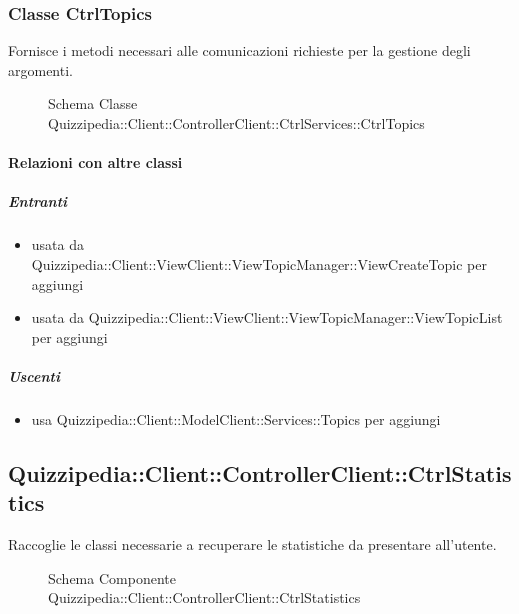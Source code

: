 \subsubsection{Classe CtrlTopics}
Fornisce i metodi necessari alle comunicazioni richieste per la gestione degli argomenti.
\begin{figure}[H]
\centering
\noindent{}
\caption[Schema Classe CtrlTopics]{Schema Classe Quizzipedia::Client::ControllerClient::CtrlServices::CtrlTopics}
\end{figure}
\paragraph{Relazioni con altre classi}
\subparagraph{Entranti}
\begin{itemize}
\item usata da Quizzipedia::Client::ViewClient::ViewTopicManager::ViewCreateTopic per aggiungi
\item usata da Quizzipedia::Client::ViewClient::ViewTopicManager::ViewTopicList per aggiungi
\end{itemize}
\subparagraph{Uscenti}
\begin{itemize}
\item usa Quizzipedia::Client::ModelClient::Services::Topics per aggiungi
\end{itemize}
\subsection{Quizzipedia::Client::ControllerClient::CtrlStatistics}
Raccoglie le classi necessarie a recuperare le statistiche da presentare all'utente.
\begin{figure}[H]
\centering
\noindent{}
\caption[Schema Componente Quizzipedia::Client::ControllerClient::CtrlStatistics]{Schema Componente Quizzipedia::Client::ControllerClient::CtrlStatistics}
\end{figure}
